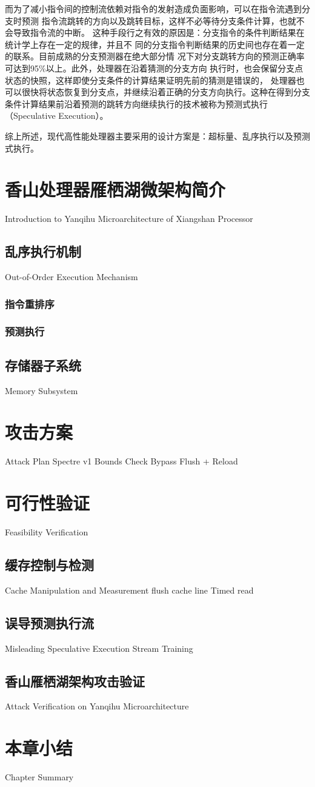 而为了减小指令间的控制流依赖对指令的发射造成负面影响，可以在指令流遇到分支时预测
指令流跳转的方向以及跳转目标，这样不必等待分支条件计算，也就不会导致指令流的中断。
这种手段行之有效的原因是：分支指令的条件判断结果在统计学上存在一定的规律，并且不
同的分支指令判断结果的历史间也存在着一定的联系。目前成熟的分支预测器在绝大部分情
况下对分支跳转方向的预测正确率可达到95\%以上。此外，处理器在沿着猜测的分支方向
执行时，也会保留分支点状态的快照，这样即使分支条件的计算结果证明先前的猜测是错误的，
处理器也可以很快将状态恢复到分支点，并继续沿着正确的分支方向执行。这种在得到分支
条件计算结果前沿着预测的跳转方向继续执行的技术被称为预测式执行（Speculative Execution）。

综上所述，现代高性能处理器主要采用的设计方案是：超标量、乱序执行以及预测式执行。


\section{香山处理器雁栖湖微架构简介}{Introduction to Yanqihu Microarchitecture of Xiangshan Processor}

\subsection{乱序执行机制}{Out-of-Order Execution Mechanism}
\somewords
\subsubsection{指令重排序}
\somewords
\subsubsection{预测执行}
\somewords
\subsection{存储器子系统}{Memory Subsystem}
\somewords


\section{攻击方案}{Attack Plan}
Spectre v1 Bounds Check Bypass
Flush + Reload
\somewords


\section{可行性验证}{Feasibility Verification}
\somewords
\subsection{缓存控制与检测}{Cache Manipulation and Measurement}
flush cache line
Timed read
\subsection{误导预测执行流}{Misleading Speculative Execution Stream}
Training
\subsection{香山雁栖湖架构攻击验证}{Attack Verification on Yanqihu Microarchitecture}
\somewords


\section{本章小结}{Chapter Summary}
\somewords


\newpage
